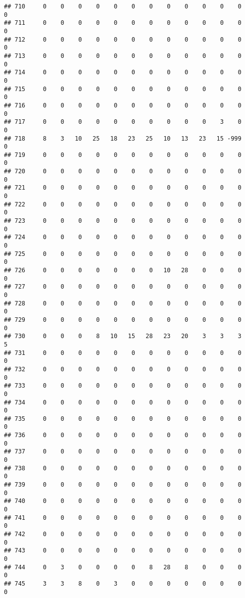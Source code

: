 \documentclass[]{article}
\begin{document}
\begin{verbatim}
## 710     0    0    0    0    0    0    0    0    0    0    0    0    0
## 711     0    0    0    0    0    0    0    0    0    0    0    0    0
## 712     0    0    0    0    0    0    0    0    0    0    0    0    0
## 713     0    0    0    0    0    0    0    0    0    0    0    0    0
## 714     0    0    0    0    0    0    0    0    0    0    0    0    0
## 715     0    0    0    0    0    0    0    0    0    0    0    0    0
## 716     0    0    0    0    0    0    0    0    0    0    0    0    0
## 717     0    0    0    0    0    0    0    0    0    0    3    0    0
## 718     8    3   10   25   18   23   25   10   13   23   15 -999    0
## 719     0    0    0    0    0    0    0    0    0    0    0    0    0
## 720     0    0    0    0    0    0    0    0    0    0    0    0    0
## 721     0    0    0    0    0    0    0    0    0    0    0    0    0
## 722     0    0    0    0    0    0    0    0    0    0    0    0    0
## 723     0    0    0    0    0    0    0    0    0    0    0    0    0
## 724     0    0    0    0    0    0    0    0    0    0    0    0    0
## 725     0    0    0    0    0    0    0    0    0    0    0    0    0
## 726     0    0    0    0    0    0    0   10   28    0    0    0    0
## 727     0    0    0    0    0    0    0    0    0    0    0    0    0
## 728     0    0    0    0    0    0    0    0    0    0    0    0    0
## 729     0    0    0    0    0    0    0    0    0    0    0    0    0
## 730     0    0    0    8   10   15   28   23   20    3    3    3    5
## 731     0    0    0    0    0    0    0    0    0    0    0    0    0
## 732     0    0    0    0    0    0    0    0    0    0    0    0    0
## 733     0    0    0    0    0    0    0    0    0    0    0    0    0
## 734     0    0    0    0    0    0    0    0    0    0    0    0    0
## 735     0    0    0    0    0    0    0    0    0    0    0    0    0
## 736     0    0    0    0    0    0    0    0    0    0    0    0    0
## 737     0    0    0    0    0    0    0    0    0    0    0    0    0
## 738     0    0    0    0    0    0    0    0    0    0    0    0    0
## 739     0    0    0    0    0    0    0    0    0    0    0    0    0
## 740     0    0    0    0    0    0    0    0    0    0    0    0    0
## 741     0    0    0    0    0    0    0    0    0    0    0    0    0
## 742     0    0    0    0    0    0    0    0    0    0    0    0    0
## 743     0    0    0    0    0    0    0    0    0    0    0    0    0
## 744     0    3    0    0    0    0    8   28    8    0    0    0    0
## 745     3    3    8    0    3    0    0    0    0    0    0    0    0

\end{verbatim}
\end{document}

